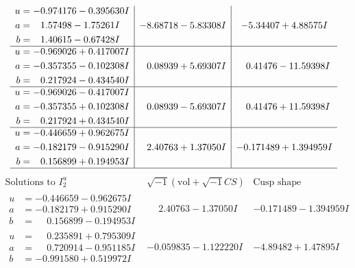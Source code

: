 \documentclass[1p]{elsarticle_modified}
\theoremstyle{definition}
\newcommand{\I}{\sqrt{-1}}
\begin{document}
$$\begin{array}{c|c|c}
\begin{aligned}
u &= -0.974176 - 0.395630 I \\
a &= \phantom{-}1.57498 - 1.75261 I \\
b &= \phantom{-}1.40615 - 0.67428 I\end{aligned}
 & -8.68718 - 5.83308 I & -5.34407 + 4.88575 I \\ \hline\begin{aligned}
u &= -0.969026 + 0.417007 I \\
a &= -0.357355 - 0.102308 I \\
b &= \phantom{-}0.217924 - 0.434540 I\end{aligned}
 & \phantom{-}0.08939 + 5.69307 I & \phantom{-}0.41476 - 11.59398 I \\ \hline\begin{aligned}
u &= -0.969026 - 0.417007 I \\
a &= -0.357355 + 0.102308 I \\
b &= \phantom{-}0.217924 + 0.434540 I\end{aligned}
 & \phantom{-}0.08939 - 5.69307 I & \phantom{-}0.41476 + 11.59398 I \\ \hline\begin{aligned}
u &= -0.446659 + 0.962675 I \\
a &= -0.182179 - 0.915290 I \\
b &= \phantom{-}0.156899 + 0.194953 I\end{aligned}
 & \phantom{-}2.40763 + 1.37050 I & -0.171489 + 1.394959 I\\
 \hline 
 \end{array}$$\newpage$$\begin{array}{c|c|c}  
\text{Solutions to }I^u_{2}& \I (\text{vol} + \sqrt{-1}CS) & \text{Cusp shape}\\
 \hline 
\begin{aligned}
u &= -0.446659 - 0.962675 I \\
a &= -0.182179 + 0.915290 I \\
b &= \phantom{-}0.156899 - 0.194953 I\end{aligned}
 & \phantom{-}2.40763 - 1.37050 I & -0.171489 - 1.394959 I \\ \hline\begin{aligned}
u &= \phantom{-}0.235891 + 0.795309 I \\
a &= \phantom{-}0.720914 - 0.951185 I \\
b &= -0.991580 + 0.519972 I\end{aligned}
 & -0.059835 - 1.122220 I & -4.89482 + 1.47895 I \\ \hline\begin{aligned}

\end{aligned}
\end{array}$$
\end{document}
